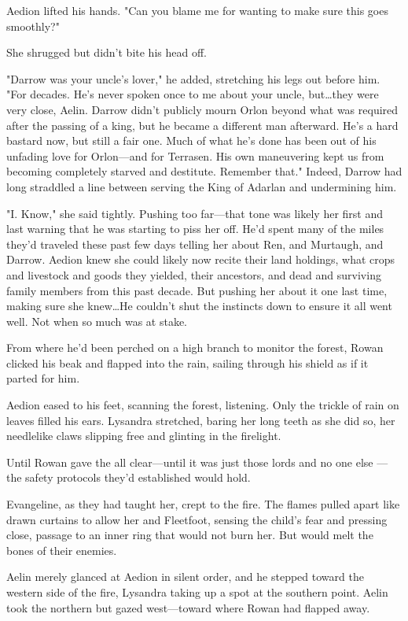 Aedion lifted his hands.
"Can you blame me for wanting to make sure this goes smoothly?"

She shrugged but didn't bite his head off.

"Darrow was your uncle's lover," he added, stretching his legs out before him.
"For decades.
He's never spoken once to me about your uncle, but\ldots they were very close, Aelin.
Darrow didn't publicly mourn Orlon beyond what was required after the passing of a king, but he became a different man afterward.
He's a hard bastard now, but still a fair one.
Much of what he's done has been out of his unfading love for Orlon---and for Terrasen.
His own maneuvering kept us from becoming completely starved and destitute.
Remember that."
Indeed, Darrow had long straddled a line between serving the King of Adarlan and undermining him.

"I.
Know," she said tightly.
Pushing too far---that tone was likely her first and last warning that he was starting to piss her off.
He'd spent many of the miles they'd traveled these past few days telling her about Ren, and Murtaugh, and Darrow.
Aedion knew she could likely now recite their land holdings, what crops and livestock and goods they yielded, their ancestors, and dead and surviving family members from this past decade.
But pushing her about it one last time, making sure she knew\ldots He couldn't shut the instincts down to ensure it all went well.
Not when so much was at stake.

From where he'd been perched on a high branch to monitor the forest, Rowan clicked his beak and flapped into the rain, sailing through his shield as if it parted for him.

Aedion eased to his feet, scanning the forest, listening.
Only the trickle of rain on leaves filled his ears.
Lysandra stretched, baring her long teeth as she did so, her needlelike claws slipping free and glinting in the firelight.

Until Rowan gave the all clear---until it was just those lords and no one else ---the safety protocols they'd established would hold.

Evangeline, as they had taught her, crept to the fire.
The flames pulled apart like drawn curtains to allow her and Fleetfoot, sensing the child's fear and pressing close, passage to an inner ring that would not burn her.
But would melt the bones of their enemies.

Aelin merely glanced at Aedion in silent order, and he stepped toward the western side of the fire, Lysandra taking up a spot at the southern point.
Aelin took the northern but gazed west---toward where Rowan had flapped away.

